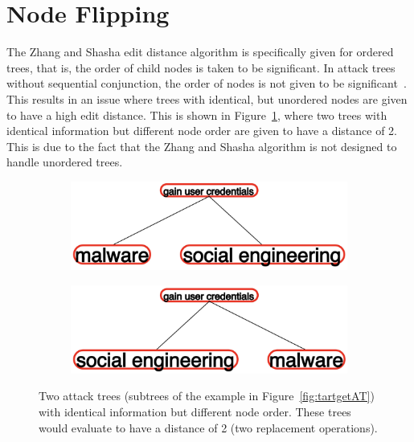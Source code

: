 \section{Node Flipping}

The Zhang and Shasha edit distance algorithm is specifically given for ordered trees, that is, the order of child nodes is taken to be significant. In attack trees without sequential conjunction, the order of nodes is not given to be significant~\cite{mauw_foundations_2006,jhawar_attack_2015}. This results in an issue where trees with identical, but unordered nodes are given to have a high edit distance. This is shown in Figure~\ref{fig:nodeflipping}, where two trees with identical information but different node order are given to have a distance of 2. This is due to the fact that the Zhang and Shasha algorithm is not designed to handle unordered trees. 


\begin{figure}
    \begin{subfigure}{.45\linewidth}
        \includegraphics[width=\linewidth]{img/NodeFlip1.png}
    \end{subfigure}
    \begin{subfigure}{.45\linewidth}
        \includegraphics[width=\linewidth]{img/NodeFlip2.png}
    \end{subfigure}
    \caption{Two attack trees (subtrees of the example in Figure~\ref{fig:tartgetAT}) with identical information but different node order. These trees would evaluate to have a distance of 2 (two replacement operations).}
    \label{fig:nodeflipping}
\end{figure}




